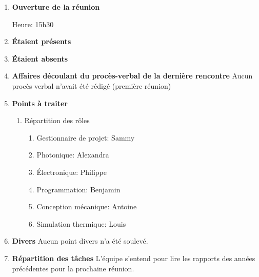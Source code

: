 \documentclass[12pt]{ULojpv}
\begin{document}
\entete
\begin{enumerate}

\item \textbf{Ouverture de la réunion}

Heure: 15h30

\item \textbf{Étaient présents}


\item \textbf{Étaient absents}

\item \textbf{Affaires découlant du procès-verbal de la dernière rencontre}
   Aucun procès verbal n'avait été rédigé (première réunion)


\item \textbf{Points à traiter}
   \begin{enumerate}
      \item Répartition des rôles
      \begin{enumerate}
         \item Gestionnaire de projet: Sammy
         \item Photonique: Alexandra
         \item Électronique: Philippe
         \item Programmation: Benjamin
         \item Conception mécanique: Antoine
         \item Simulation thermique: Louis
      \end{enumerate}
   \end{enumerate}

\item \textbf{Divers}
   Aucun point divers n'a été soulevé.

\item \textbf{Répartition des tâches}
   L'équipe s'entend pour lire les rapports des années précédentes pour la prochaine réunion.




\end{enumerate}
\end{document}
